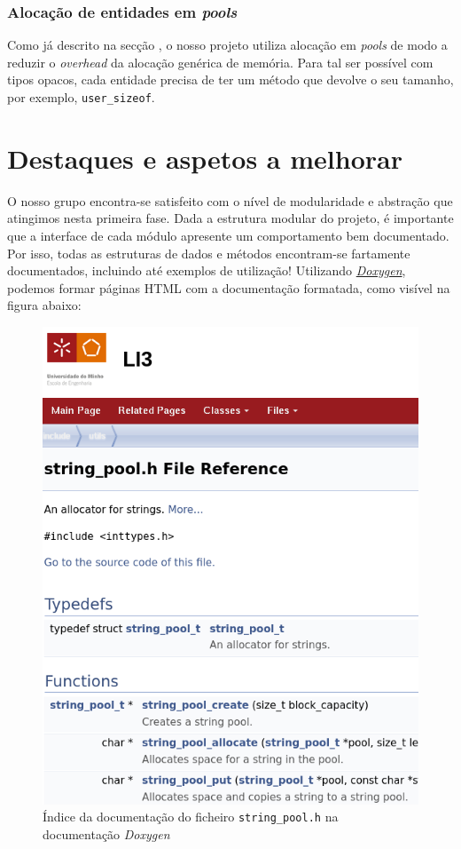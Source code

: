 \documentclass[12pt, a4paper]{article}
\begin{document}
\subsubsection{Alocação de entidades em \emph{pools}}

Como já descrito na secção , o nosso projeto utiliza alocação em \emph{pools}
de modo a reduzir o \emph{overhead} da alocação genérica de memória. Para tal ser possível com
tipos opacos, cada entidade precisa de ter um método que devolve o seu tamanho, por exemplo,
\texttt{user\_sizeof}.

\section{Destaques e aspetos a melhorar}

O nosso grupo encontra-se satisfeito com o nível de modularidade e abstração que atingimos nesta
primeira fase. Dada a estrutura modular do projeto, é importante que a interface de cada módulo
apresente um comportamento bem documentado. Por isso, todas as estruturas de dados e métodos
encontram-se fartamente documentados, incluindo até exemplos de utilização! Utilizando
\href{https://www.doxygen.nl}{\emph{Doxygen}}, podemos formar páginas HTML com a documentação
formatada, como visível na figura abaixo:

\begin{figure}[ht]
    \centering
    \includegraphics[scale=0.35]{res/doxygen.png}
    \caption{Índice da documentação do ficheiro \texttt{string\_pool.h} na documentação
             \emph{Doxygen}}
    \label{fig:doxygen}
\end{figure}
\end{document}
